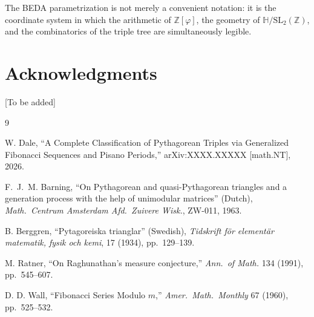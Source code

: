 \documentclass[12pt]{article}
\begin{document}
The BEDA parametrization is not merely a convenient notation: it is the coordinate system
in which the arithmetic of $\mathbb{Z}[\varphi]$, the geometry of $\mathbb{H}/\mathrm{SL}_2(\mathbb{Z})$,
and the combinatorics of the triple tree are simultaneously legible.

\section*{Acknowledgments}
[To be added]

\begin{thebibliography}{9}

W. Dale, ``A Complete Classification of Pythagorean Triples via Generalized
Fibonacci Sequences and Pisano Periods,''
arXiv:XXXX.XXXXX [math.NT], 2026.  %

F.~J.~M. Barning, ``On Pythagorean and quasi-Pythagorean triangles and a generation
process with the help of unimodular matrices'' (Dutch), \emph{Math.\ Centrum Amsterdam
Afd.\ Zuivere Wisk.}, ZW-011, 1963.

B. Berggren, ``Pytagoreiska trianglar'' (Swedish), \emph{Tidskrift f{\"o}r
element{\"a}r matematik, fysik och kemi}, 17 (1934), pp.~129--139.

M. Ratner, ``On Raghunathan's measure conjecture,'' \emph{Ann.\ of Math.}
134 (1991), pp.~545--607.

D. D. Wall, ``Fibonacci Series Modulo $m$,'' \emph{Amer.\ Math.\ Monthly}
67 (1960), pp.~525--532.

\end{thebibliography}
\end{document}
